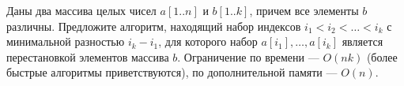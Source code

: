 \documentclass{article}
\begin{document}
Даны два массива целых чисел $a[1..n]$ и $b[1..k]$, причем все элементы $b$ различны. Предложите алгоритм, находящий набор индексов $i_1 < i_2 < \ldots < i_k$ с минимальной разностью $i_k-i_1$, для которого набор $a[i_1],\ldots, a[i_k]$ является перестановкой элементов массива $b$. Ограничение по времени --- $O(nk)$ (более быстрые алгоритмы приветствуются), по дополнительной памяти --- $O(n)$.
\end{document}
